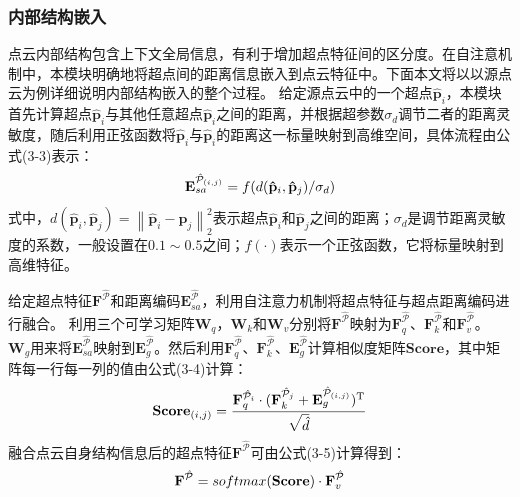     \subsubsection{内部结构嵌入}
    点云内部结构包含上下文全局信息，有利于增加超点特征间的区分度。在自注意机制中，本模块明确地将超点间的距离信息嵌入到点云特征中。下面本文将以以源点云为例详细说明内部结构嵌入的整个过程。
    给定源点云中的一个超点$\mathbf{\hat{p}}_{i}$，本模块首先计算超点$\mathbf{\hat{p}}_{i}$与其他任意超点$\mathbf{\hat{p}}_{i}$之间的距离，并根据超参数$\sigma_{d}$调节二者的距离灵敏度，随后利用正弦函数将$\mathbf{\hat{p}}_{i}$与$\mathbf{\hat{p}}_{i}$的距离这一标量映射到高维空间，具体流程由公式(3-3)表示：
    \begin{equation}
        \centering
            \mathbf{E}_{sa}^{\mathcal{\hat{P}}_{(i,j)}} = f(d(\mathbf{\hat{p}}_{i},\mathbf{\hat{p}}_{j})/\sigma_{d})
    \end{equation}
    式中，$d(\mathbf{\hat{p}}_{i},\mathbf{\hat{p}}_{j})=\left\|{\mathbf{\hat{p}}_{i}-\mathbf{\hat{p}}_{j}}\right\|_{2}^{2}$表示超点$\mathbf{\hat{p}}_{i}$和$\mathbf{\hat{p}}_{j}$之间的距离；$\sigma_{d}$是调节距离灵敏度的系数，一般设置在$0.1\sim 0.5$之间；$f(\cdot)$表示一个正弦函数，它将标量映射到高维特征。

    给定超点特征$\mathbf{F}^{\mathcal{\hat{P}}}$和距离编码$\mathbf{E}_{sa}^{\mathcal{\hat{P}}}$，利用自注意力机制将超点特征与超点距离编码进行融合。
    利用三个可学习矩阵$\mathbf{W}_{q}$，$\mathbf{W}_{k}$和$\mathbf{W}_{v}$分别将$\mathbf{F}^{\mathcal{\hat{P}}}$映射为$\mathbf{F}_{q}^{\mathcal{\hat{P}}}$、$\mathbf{F}_{k}^{\mathcal{\hat{P}}}$和$\mathbf{F}_{v}^{\mathcal{\hat{P}}}$。
    $\mathbf{W}_{g}$用来将$\mathbf{E}_{sa}^{\mathcal{\hat{P}}}$映射到$\mathbf{E}_{g}^{\mathcal{\hat{P}}}$。然后利用$\mathbf{F}_{q}^{\mathcal{\hat{P}}}$、$\mathbf{F}_{k}^{\mathcal{\hat{P}}}$、$\mathbf{E}_{g}^{\mathcal{\hat{P}}}$计算相似度矩阵$\mathbf{Score}$，其中矩阵每一行每一列的值由公式(3-4)计算：
    \begin{equation}
        \centering
        \mathbf{Score}_{(i, j)}= 
        \frac{
        \mathbf{F}_{q}^{\mathcal{\hat{P}}_{i}} \cdot (\mathbf{F}_{k}^{\mathcal{\hat{P}}_{j}} + \mathbf{E}_{g}^{\mathcal{\hat{P}}_{(i, j)}})^\mathrm{T}
        }{\sqrt{\hat{d}}}
    \end{equation}
    融合点云自身结构信息后的超点特征$\mathbf{F}^{\mathcal{\hat{P}}}$可由公式(3-5)计算得到：
    \begin{equation}
        \centering
        \mathbf{F}^{\mathcal{\hat{P}}} =softmax(\mathbf{Score}) \cdot \mathbf{F}_{v}^{\mathcal{\hat{P}}}
    \end{equation}\par

